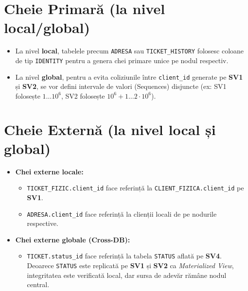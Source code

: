 \documentclass{article}
\begin{document}
\section{Cheie Primară (la nivel local/global)}
\begin{itemize}
\item La nivel \textbf{local}, tabelele precum \texttt{ADRESA} sau \texttt{TICKET\_HISTORY} folosesc coloane de tip \texttt{IDENTITY} pentru a genera chei primare unice pe nodul respectiv.

\item La nivel \textbf{global}, pentru a evita coliziunile între \texttt{client_id} generate pe \textbf{SV1} și \textbf{SV2}, se vor defini intervale de valori (Sequences) disjuncte (ex: SV1 folosește $1 \dots 10^6$, SV2 folosește $10^6+1 \dots 2 \cdot 10^6$).

\end{itemize}

\section{Cheie Externă (la nivel local și global)}

\begin{itemize}
\item \textbf{Chei externe locale:}

\begin{itemize}
\item \texttt{TICKET\_FIZIC.client\_id} face referință la \texttt{CLIENT\_FIZICA.client_id} pe \textbf{SV1}.\item \texttt{ADRESA.client\_id} face referință la clienții locali de pe nodurile respective.

\end{itemize}
\item \textbf{Chei externe globale (Cross-DB):}

\begin{itemize}
\item \texttt{TICKET.status\_id} face referință la tabela \texttt{STATUS} aflată pe \textbf{SV4}. Deoarece \texttt{STATUS} este replicată pe \textbf{SV1} și \textbf{SV2} ca \textit{Materialized View}, integritatea este verificată local, dar sursa de adevăr rămâne nodul central.

\end{itemize}
\end{itemize}
\end{document}
